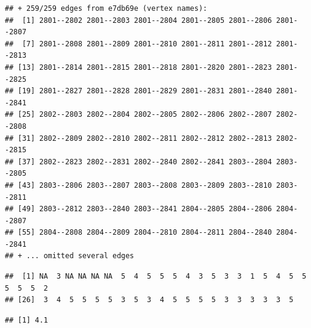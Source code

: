 \documentclass[
]{book}
\newenvironment{Shaded}{\begin{snugshade}}{\end{snugshade}}
\newcommand{\AttributeTok}[1]{\textcolor[rgb]{0.77,0.63,0.00}{#1}}
\newcommand{\CommentTok}[1]{\textcolor[rgb]{0.56,0.35,0.01}{\textit{#1}}}
\newcommand{\ConstantTok}[1]{\textcolor[rgb]{0.00,0.00,0.00}{#1}}
\newcommand{\FunctionTok}[1]{\textcolor[rgb]{0.00,0.00,0.00}{#1}}
\newcommand{\NormalTok}[1]{#1}
\newcommand{\SpecialCharTok}[1]{\textcolor[rgb]{0.00,0.00,0.00}{#1}}
\begin{document}
\begin{verbatim}
## + 259/259 edges from e7db69e (vertex names):
##  [1] 2801--2802 2801--2803 2801--2804 2801--2805 2801--2806 2801--2807
##  [7] 2801--2808 2801--2809 2801--2810 2801--2811 2801--2812 2801--2813
## [13] 2801--2814 2801--2815 2801--2818 2801--2820 2801--2823 2801--2825
## [19] 2801--2827 2801--2828 2801--2829 2801--2831 2801--2840 2801--2841
## [25] 2802--2803 2802--2804 2802--2805 2802--2806 2802--2807 2802--2808
## [31] 2802--2809 2802--2810 2802--2811 2802--2812 2802--2813 2802--2815
## [37] 2802--2823 2802--2831 2802--2840 2802--2841 2803--2804 2803--2805
## [43] 2803--2806 2803--2807 2803--2808 2803--2809 2803--2810 2803--2811
## [49] 2803--2812 2803--2840 2803--2841 2804--2805 2804--2806 2804--2807
## [55] 2804--2808 2804--2809 2804--2810 2804--2811 2804--2840 2804--2841
## + ... omitted several edges
\end{verbatim}

\begin{Shaded}
\end{Shaded}

\begin{verbatim}
##  [1] NA  3 NA NA NA NA  5  4  5  5  5  4  3  5  3  3  1  5  4  5  5  5  5  5  2
## [26]  3  4  5  5  5  5  3  5  3  4  5  5  5  5  3  3  3  3  3  5
\end{verbatim}

\begin{Shaded}
\end{Shaded}

\begin{verbatim}
## [1] 4.1
\end{verbatim}

\begin{Shaded}
\end{Shaded}
\end{document}
